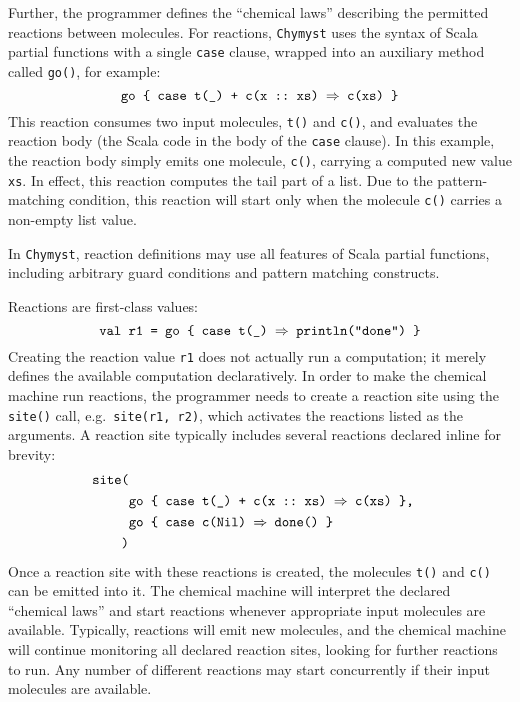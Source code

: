 \documentclass[sigplan,10pt]{acmart}\settopmatter{}
\begin{document}
Further, the programmer defines the ``chemical laws'' describing
the permitted reactions between molecules. For reactions, \texttt{Chymyst}
uses the syntax of Scala partial functions with a single \texttt{case}
clause, wrapped into an auxiliary method called \texttt{go()}, for
example:
\[
\text{\texttt{go \{ case t(\_) + c(x ::~xs) \ensuremath{\Rightarrow} c(xs) \}}}
\]
This reaction consumes two input molecules, \texttt{t()} and \texttt{c()},
and evaluates the reaction body (the Scala code in the body of the
\texttt{case} clause). In this example, the reaction body simply emits
one molecule, \texttt{c()}, carrying a computed new value \texttt{xs}.
In effect, this reaction computes the tail part of a list.
Due to the pattern-matching condition, this reaction will start only
when the molecule \texttt{c()} carries a non-empty list value.

In \texttt{Chymyst}, reaction definitions may use all features of
Scala partial functions, including arbitrary guard conditions and
pattern matching constructs.

Reactions are first-class values:
\[
\text{\texttt{val r1 = go \{ case t(\_) \ensuremath{\Rightarrow} println("done") \}}}
\]
Creating the reaction value \texttt{r1} does not actually run a computation;
it merely defines the available computation declaratively. In order
to make the chemical machine run reactions, the programmer needs to
create a reaction site using the \texttt{site()} call, e.g.~\texttt{site(r1,
r2)}, which activates the reactions listed as the arguments. A reaction
site typically includes several reactions declared inline for brevity:
\begin{align*}
\text{\texttt{site(}}\\
 & \text{\texttt{go \{ case t(\_) + c(x ::~xs) \ensuremath{\Rightarrow} c(xs) \},}}\\
 & \text{\text{\texttt{go \{ case c(Nil) }}\texttt{\ensuremath{\Rightarrow} done() \}}}\\
\text{\texttt{)}}
\end{align*}
Once a reaction site with these reactions is created, the molecules
\texttt{t()} and \texttt{c()} can be emitted into it. The chemical
machine will interpret the declared ``chemical laws'' and start
reactions whenever appropriate input molecules are available. Typically,
reactions will emit new molecules, and the chemical machine will continue
monitoring all declared reaction sites, looking for further reactions
to run. Any number of
different reactions may start concurrently if their input molecules
are available.
\end{document}
